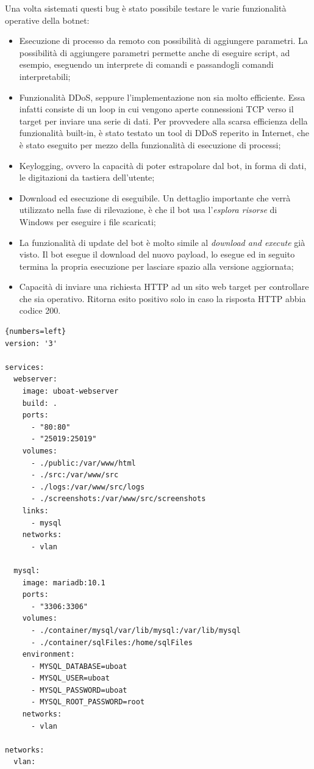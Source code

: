 Una volta sistemati questi bug è stato possibile testare le varie funzionalità operative della botnet:
\begin{itemize}
    \item Esecuzione di processo da remoto con possibilità di aggiungere parametri. La possibilità di aggiungere parametri permette anche di eseguire script, ad esempio, eseguendo un interprete di comandi e passandogli comandi interpretabili;
    \item Funzionalità DDoS, seppure l'implementazione non sia molto efficiente. Essa infatti consiste di un loop in cui vengono aperte connessioni TCP verso il target per inviare una serie di dati. Per provvedere alla scarsa efficienza della funzionalità built-in, è stato testato un tool di DDoS reperito in Internet, che è stato eseguito per mezzo della funzionalità di esecuzione di processi;
    \item Keylogging, ovvero la capacità di poter estrapolare  dal bot, in forma di dati, le digitazioni da tastiera dell'utente;
    \item Download ed esecuzione di eseguibile. Un dettaglio importante che verrà utilizzato nella fase di rilevazione, è che il bot usa l'\textit{esplora risorse} di Windows per eseguire i file scaricati;
    \item La funzionalità di update del bot è molto simile al \textit{download and execute} già visto. Il bot esegue il download del nuovo payload, lo esegue ed in seguito termina la propria esecuzione per lasciare spazio alla versione aggiornata;
    \item Capacità di inviare una richiesta HTTP ad un sito web target per controllare che sia operativo. Ritorna esito positivo solo in caso la risposta HTTP abbia codice 200.
\end{itemize}





\begin{lstlisting}[firstnumber=1,floatplacement=H,caption={File di configurazione docker compose.},captionpos=b,label={listing-uboat2}]{numbers=left}
version: '3'

services:
  webserver:
    image: uboat-webserver
    build: .
    ports:
      - "80:80"
      - "25019:25019"
    volumes:
      - ./public:/var/www/html
      - ./src:/var/www/src
      - ./logs:/var/www/src/logs
      - ./screenshots:/var/www/src/screenshots
    links:
      - mysql
    networks:
      - vlan

  mysql:
    image: mariadb:10.1
    ports:
      - "3306:3306"
    volumes:
      - ./container/mysql/var/lib/mysql:/var/lib/mysql
      - ./container/sqlFiles:/home/sqlFiles
    environment:
      - MYSQL_DATABASE=uboat
      - MYSQL_USER=uboat
      - MYSQL_PASSWORD=uboat
      - MYSQL_ROOT_PASSWORD=root
    networks:
      - vlan

networks:
  vlan:
\end{lstlisting}

